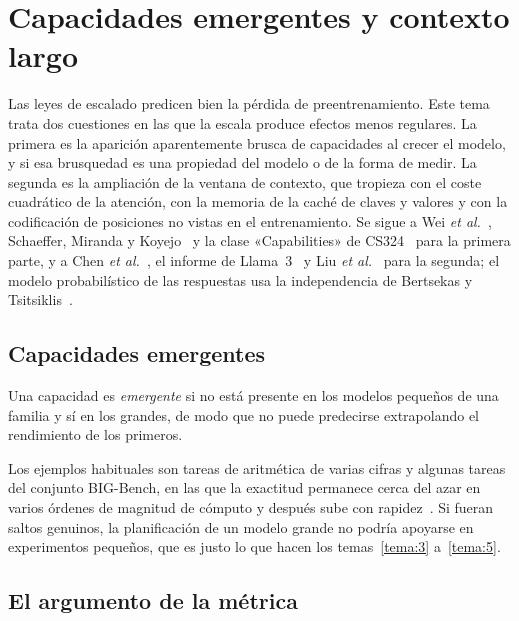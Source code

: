 \chapter{Capacidades emergentes y contexto largo}
\label{tema:6}

Las leyes de escalado predicen bien la pérdida de preentrenamiento. Este tema trata dos cuestiones en las que la escala produce efectos menos regulares. La primera es la aparición aparentemente brusca de capacidades al crecer el modelo, y si esa brusquedad es una propiedad del modelo o de la forma de medir. La segunda es la ampliación de la ventana de contexto, que tropieza con el coste cuadrático de la atención, con la memoria de la caché de claves y valores y con la codificación de posiciones no vistas en el entrenamiento. Se sigue a Wei \emph{et al.}~\cite{wei}, Schaeffer, Miranda y Koyejo~\cite{schaeffer} y la clase «Capabilities» de CS324~\cite{cs324} para la primera parte, y a Chen \emph{et al.}~\cite{chenpi}, el informe de Llama~3~\cite[§3.4.2]{llama3} y Liu \emph{et al.}~\cite{liu} para la segunda; el modelo probabilístico de las respuestas usa la independencia de Bertsekas y Tsitsiklis~\cite[§1.5]{bt}.

\section{Capacidades emergentes}

\begin{definicion}
Una capacidad es \emph{emergente} si no está presente en los modelos pequeños de una familia y sí en los grandes, de modo que no puede predecirse extrapolando el rendimiento de los primeros.
\end{definicion}

Los ejemplos habituales son tareas de aritmética de varias cifras y algunas tareas del conjunto BIG-Bench, en las que la exactitud permanece cerca del azar en varios órdenes de magnitud de cómputo y después sube con rapidez~\cite{wei}. Si fueran saltos genuinos, la planificación de un modelo grande no podría apoyarse en experimentos pequeños, que es justo lo que hacen los temas~\ref{tema:3} a~\ref{tema:5}.

\section{El argumento de la métrica}

